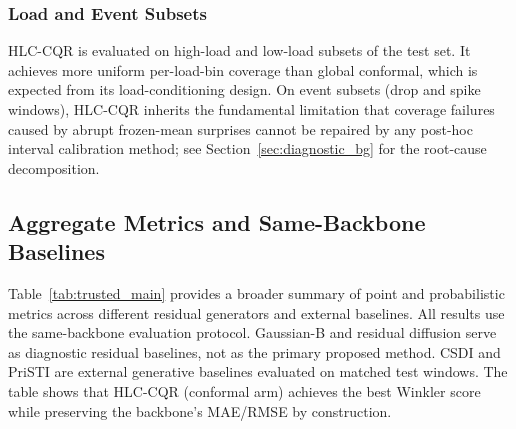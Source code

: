 \documentclass[letterpaper,journal]{IEEEtran}
\begin{document}
\subsubsection{Load and Event Subsets}
HLC-CQR is evaluated on high-load and low-load subsets of the test set.  It
achieves more uniform per-load-bin coverage than global conformal, which is
expected from its load-conditioning design.  On event subsets (drop and
spike windows), HLC-CQR inherits the fundamental limitation that coverage
failures caused by abrupt frozen-mean surprises cannot be repaired by any
post-hoc interval calibration method; see Section~\ref{sec:diagnostic_bg}
for the root-cause decomposition.

\subsection{Aggregate Metrics and Same-Backbone Baselines}
\label{sec:aggregate}

Table~\ref{tab:trusted_main} provides a broader summary of point and
probabilistic metrics across different residual generators and external
baselines.  All results use the same-backbone evaluation protocol.
Gaussian-B and residual diffusion serve as diagnostic residual baselines,
not as the primary proposed method.  CSDI and PriSTI are external generative
baselines evaluated on matched test windows.  The table shows that
HLC-CQR (conformal arm) achieves the best Winkler score while preserving the
backbone's MAE/RMSE by construction.
\end{document}
